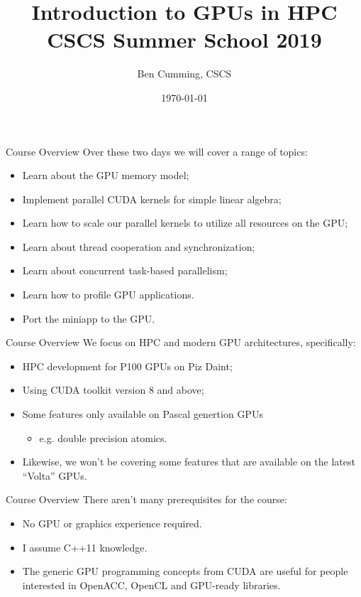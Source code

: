 \documentclass[aspectratio=43]{beamer}
\author{Ben Cumming, CSCS}
\title{Introduction to GPUs in HPC\\CSCS Summer School 2019}
\subtitle{}
\date{\today}
\begin{document}
\cscstitle


\begin{frame}[fragile]{Course Overview}
    Over these two days we will cover a range of topics:
    \begin{itemize}
        \item Learn about the GPU memory model;
        \item Implement parallel CUDA kernels for simple linear algebra;
        \item Learn how to scale our parallel kernels to utilize all resources on the GPU;
        \item Learn about thread cooperation and synchronization;
        \item Learn about concurrent task-based parallelism;
        \item Learn how to profile GPU applications.
        \item Port the miniapp to the GPU.
    \end{itemize}
\end{frame}

\begin{frame}[fragile]{Course Overview}
    We focus on HPC and modern GPU architectures, specifically:
    \begin{itemize}
        \item HPC development for P100 GPUs on Piz Daint;
        \item Using CUDA toolkit version 8 and above;
        \item Some features only available on Pascal genertion GPUs
        \begin{itemize}
            \item  e.g. double precision atomics.
        \end{itemize}
        \item Likewise, we won't be covering some features that are available on the latest ``Volta'' GPUs.
    \end{itemize}
\end{frame}

\begin{frame}[fragile]{Course Overview}
    There aren't many prerequisites for the course:
    \begin{itemize}
        \item No GPU or graphics experience required.
        \item I assume C++11 knowledge.
        \item The generic GPU programming concepts from CUDA are useful for people interested in OpenACC, OpenCL and GPU-ready libraries.
    \end{itemize}
\end{frame}
\end{document}
